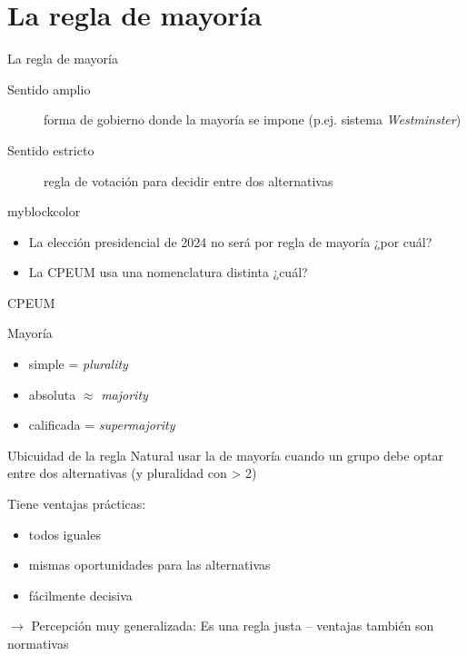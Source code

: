 \documentclass[bigger]{beamer}
\begin{document}
\section{La regla de mayoría}
\label{sec:org65166af}

\begin{frame}[label={sec:orgb2369ae}]{La regla de mayoría}
\begin{description}
\item[{Sentido amplio}] forma de gobierno donde la mayoría se impone (p.ej. sistema \emph{Westminster})
\item[{Sentido estricto}] regla de votación para decidir entre dos alternativas
\end{description}
\bigskip \pause
{}
\begin{beamercolorbox}{myblockcolor}
\begin{itemize}
\item La elección presidencial de 2024 no será por regla de mayoría ¿por cuál?
\item La CPEUM usa una nomenclatura distinta ¿cuál?
\end{itemize}
\end{beamercolorbox}
\end{frame}

\begin{frame}[label={sec:org0af03b8}]{CPEUM}
\begin{block}{Mayoría}
\begin{itemize}
\item simple = \emph{plurality}
\item absoluta \(\approx\) \emph{majority}
\item calificada = \emph{supermajority}
\end{itemize}
\end{block}
\end{frame}


\begin{frame}[label={sec:org6270a92}]{Ubicuidad de la regla}
Natural usar la de mayoría cuando un grupo debe optar entre dos alternativas (y pluralidad con > 2)

\bigskip
Tiene ventajas prácticas:
\begin{itemize}
\item todos iguales
\item mismas oportunidades para las alternativas
\item fácilmente decisiva
\end{itemize}
\bigskip
\begin{block}{\(\rightarrow\) Percepción muy generalizada:}
Es una regla \alert{justa} -- ventajas también son normativas
\end{block}
\end{frame}
\end{document}
